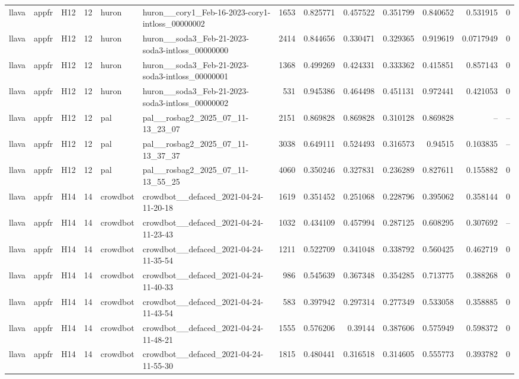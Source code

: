 \begin{longtable}{lllrllrrrrrrr}
llava & appfr & H12 & 12 & huron & huron\_\_cory1\_Feb-16-2023-cory1-intloss\_00000002 & 1653 & 0.825771 & 0.457522 & 0.351799 & 0.840652 & 0.531915 & 0 \\
llava & appfr & H12 & 12 & huron & huron\_\_soda3\_Feb-21-2023-soda3-intloss\_00000000 & 2414 & 0.844656 & 0.330471 & 0.329365 & 0.919619 & 0.0717949 & 0 \\
llava & appfr & H12 & 12 & huron & huron\_\_soda3\_Feb-21-2023-soda3-intloss\_00000001 & 1368 & 0.499269 & 0.424331 & 0.333362 & 0.415851 & 0.857143 & 0 \\
llava & appfr & H12 & 12 & huron & huron\_\_soda3\_Feb-21-2023-soda3-intloss\_00000002 & 531 & 0.945386 & 0.464498 & 0.451131 & 0.972441 & 0.421053 & 0 \\
llava & appfr & H12 & 12 & pal & pal\_\_rosbag2\_2025\_07\_11-13\_23\_07 & 2151 & 0.869828 & 0.869828 & 0.310128 & 0.869828 & -- & -- \\
llava & appfr & H12 & 12 & pal & pal\_\_rosbag2\_2025\_07\_11-13\_37\_37 & 3038 & 0.649111 & 0.524493 & 0.316573 & 0.94515 & 0.103835 & -- \\
llava & appfr & H12 & 12 & pal & pal\_\_rosbag2\_2025\_07\_11-13\_55\_25 & 4060 & 0.350246 & 0.327831 & 0.236289 & 0.827611 & 0.155882 & 0 \\
llava & appfr & H14 & 14 & crowdbot & crowdbot\_\_defaced\_2021-04-24-11-20-18 & 1619 & 0.351452 & 0.251068 & 0.228796 & 0.395062 & 0.358144 & 0 \\
llava & appfr & H14 & 14 & crowdbot & crowdbot\_\_defaced\_2021-04-24-11-23-43 & 1032 & 0.434109 & 0.457994 & 0.287125 & 0.608295 & 0.307692 & -- \\
llava & appfr & H14 & 14 & crowdbot & crowdbot\_\_defaced\_2021-04-24-11-35-54 & 1211 & 0.522709 & 0.341048 & 0.338792 & 0.560425 & 0.462719 & 0 \\
llava & appfr & H14 & 14 & crowdbot & crowdbot\_\_defaced\_2021-04-24-11-40-33 & 986 & 0.545639 & 0.367348 & 0.354285 & 0.713775 & 0.388268 & 0 \\
llava & appfr & H14 & 14 & crowdbot & crowdbot\_\_defaced\_2021-04-24-11-43-54 & 583 & 0.397942 & 0.297314 & 0.277349 & 0.533058 & 0.358885 & 0 \\
llava & appfr & H14 & 14 & crowdbot & crowdbot\_\_defaced\_2021-04-24-11-48-21 & 1555 & 0.576206 & 0.39144 & 0.387606 & 0.575949 & 0.598372 & 0 \\
llava & appfr & H14 & 14 & crowdbot & crowdbot\_\_defaced\_2021-04-24-11-55-30 & 1815 & 0.480441 & 0.316518 & 0.314605 & 0.555773 & 0.393782 & 0 \\

\end{longtable}
